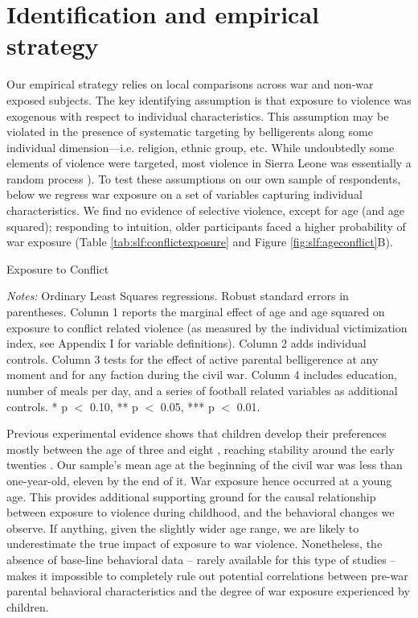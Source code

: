 \section{Identification and empirical strategy}
\label{sec:slf:identification}
Our empirical strategy relies on local comparisons across war and non-war exposed subjects. The key identifying assumption is that exposure to violence was exogenous with respect to individual characteristics. This assumption may be violated in the presence of systematic targeting by belligerents along some individual dimension––i.e. religion, ethnic group, etc. While undoubtedly some elements of violence were targeted, most violence in Sierra Leone was essentially a random process \citep{Conibere2004,Humphreys2006,Bellows2009b}). To test these assumptions on our own sample of respondents, below we regress war exposure on a set of variables capturing individual characteristics.  We find no evidence of selective violence, except for age (and age squared); responding to intuition, older participants faced a higher probability of war exposure (Table \ref{tab:slf:conflictexposure} and Figure \ref{fig:slf:ageconflict}B). 

\begin{threeparttable}[htb]
	\caption{Exposure to Conflict}
	\label{tab:slf:conflictexposure}
	\centering
	
	\begin{tablenotes}
		\item \textit{Notes:} Ordinary Least Squares regressions. Robust standard errors in parentheses. Column 1 reports the marginal effect of age and age squared on exposure to conflict related violence (as measured by the individual victimization index, see Appendix I for variable definitions). Column 2 adds individual controls. Column 3 tests for the effect of active parental belligerence at any moment and for any faction during the civil war. Column 4 includes education, number of meals per day, and a series of football related variables as additional controls.  * p $<$ 0.10, ** p $<$ 0.05, *** p $<$ 0.01.
		\item
	\end{tablenotes}
\end{threeparttable}

Previous experimental evidence shows that children develop their preferences mostly between the age of three and eight \citep{Benenson2007,Fehr2008}, reaching stability around the early twenties \citep{Sutter2007a}. Our sample’s mean age at the beginning of the civil war was less than one-year-old, eleven by the end of it. War exposure hence occurred at a young age. This provides additional supporting ground for the causal relationship between exposure to violence during childhood, and the behavioral changes we observe. If anything, given the slightly wider age range, we are likely to underestimate the true impact of exposure to war violence. Nonetheless, the absence of base-line behavioral data – rarely available for this type of studies – makes it impossible to completely rule out potential correlations between pre-war parental behavioral characteristics and the degree of war exposure experienced by children. 

